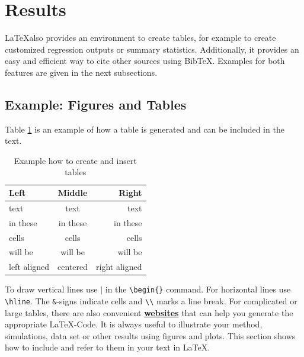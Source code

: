 \documentclass[12pt]{article}
\begin{document}
\section{Results}\label{sec:results}
\LaTeX also provides an environment to create tables, for example to create customized regression outputs or summary statistics. Additionally, it provides an easy and efficient way to cite other sources using BibTeX. Examples for both features are given in the next subsections. 
\subsection{Example: Figures and Tables}

Table \ref{tab:exmpl1} is an example of how a table is generated and can be included in the text.
\begin{table}[h]
	\centering
	\begin{tabular}{l|c r}
		\hline
		\textbf{Left} & \textbf{Middle} & \textbf{Right} \\ \hline \hline
		text & text & text \\ 
		in these & in these & in these \\ 
		cells & cells & cells \\
		will be & will be & will be \\
		left aligned & centered & right aligned \\ \hline
	\end{tabular}
	\caption{Example how to create and insert tables}
	\label{tab:exmpl1}
\end{table} 
To draw vertical lines use $|$ in the \texttt{\textbackslash begin\{\}} command. For horizontal lines use \texttt{\textbackslash hline}. The \texttt{\&}-signs indicate cells and \texttt{\textbackslash \textbackslash} marks a line break. For complicated or large tables, there are also convenient \href{https://www.tablesgenerator.com/}{\textbf{websites}} that can help you generate the appropriate \LaTeX-Code.
It is always useful to illustrate your method, simulations, data set or other results using figures and plots. This section shows how to include and refer to them in your text in \LaTeX.
\end{document}
